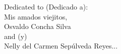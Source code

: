 \documentclass[]{book}
\begin{document}
\clearpage
\thispagestyle{empty}
\phantom{a}
\vfill

\begin{dedication}

\centering
Dedicated to (Dedicado a):\\
\vspace{7cm}
Mis amados viejitos,\\ Osvaldo Concha Silva\\ and (y) \\ Nelly del Carmen Sep\'ulveda Reyes...

\end{dedication}

\tableofcontents

\listoffigures

\listoftables


\printglossaries


% 








\printindex

%
%




\listoftodos
\end{document}

